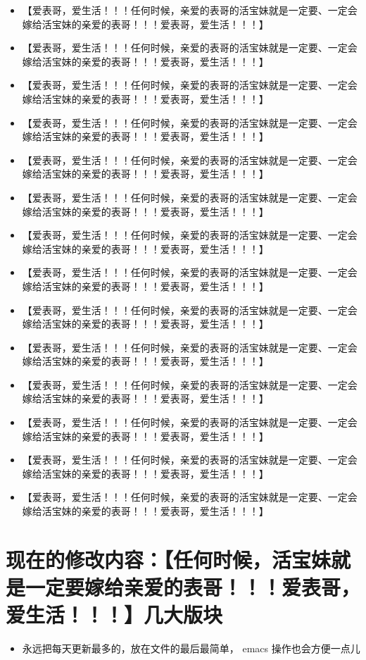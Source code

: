\documentclass[9pt, b5paper]{article}
\begin{document}
\begin{itemize}
\item 【爱表哥，爱生活！！！任何时候，亲爱的表哥的活宝妹就是一定要、一定会嫁给活宝妹的亲爱的表哥！！！爱表哥，爱生活！！！】
\item 【爱表哥，爱生活！！！任何时候，亲爱的表哥的活宝妹就是一定要、一定会嫁给活宝妹的亲爱的表哥！！！爱表哥，爱生活！！！】
\item 【爱表哥，爱生活！！！任何时候，亲爱的表哥的活宝妹就是一定要、一定会嫁给活宝妹的亲爱的表哥！！！爱表哥，爱生活！！！】
\item 【爱表哥，爱生活！！！任何时候，亲爱的表哥的活宝妹就是一定要、一定会嫁给活宝妹的亲爱的表哥！！！爱表哥，爱生活！！！】
\item 【爱表哥，爱生活！！！任何时候，亲爱的表哥的活宝妹就是一定要、一定会嫁给活宝妹的亲爱的表哥！！！爱表哥，爱生活！！！】
\item 【爱表哥，爱生活！！！任何时候，亲爱的表哥的活宝妹就是一定要、一定会嫁给活宝妹的亲爱的表哥！！！爱表哥，爱生活！！！】
\item 【爱表哥，爱生活！！！任何时候，亲爱的表哥的活宝妹就是一定要、一定会嫁给活宝妹的亲爱的表哥！！！爱表哥，爱生活！！！】
\item 【爱表哥，爱生活！！！任何时候，亲爱的表哥的活宝妹就是一定要、一定会嫁给活宝妹的亲爱的表哥！！！爱表哥，爱生活！！！】
\item 【爱表哥，爱生活！！！任何时候，亲爱的表哥的活宝妹就是一定要、一定会嫁给活宝妹的亲爱的表哥！！！爱表哥，爱生活！！！】
\item 【爱表哥，爱生活！！！任何时候，亲爱的表哥的活宝妹就是一定要、一定会嫁给活宝妹的亲爱的表哥！！！爱表哥，爱生活！！！】
\item 【爱表哥，爱生活！！！任何时候，亲爱的表哥的活宝妹就是一定要、一定会嫁给活宝妹的亲爱的表哥！！！爱表哥，爱生活！！！】
\item 【爱表哥，爱生活！！！任何时候，亲爱的表哥的活宝妹就是一定要、一定会嫁给活宝妹的亲爱的表哥！！！爱表哥，爱生活！！！】
\item 【爱表哥，爱生活！！！任何时候，亲爱的表哥的活宝妹就是一定要、一定会嫁给活宝妹的亲爱的表哥！！！爱表哥，爱生活！！！】
\item 【爱表哥，爱生活！！！任何时候，亲爱的表哥的活宝妹就是一定要、一定会嫁给活宝妹的亲爱的表哥！！！爱表哥，爱生活！！！】
\end{itemize}

\section{现在的修改内容：【任何时候，活宝妹就是一定要嫁给亲爱的表哥！！！爱表哥，爱生活！！！】几大版块}
\label{sec:org8cba8c0}
\begin{itemize}
\item 永远把每天更新最多的，放在文件的最后最简单， emacs 操作也会方便一点儿
\end{itemize}
\end{document}
